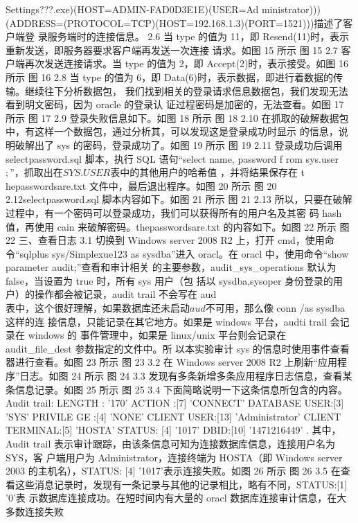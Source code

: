 Settings\Administrator\????\tools\oracle\sqlplus.exe)(HOST=ADMIN-FAD0D3E1E)(USER=Ad
ministrator)))(ADDRESS=(PROTOCOL=TCP)(HOST=192.168.1.3)(PORT=1521)))描述了客户端登
录服务端时的连接信息。
2.6 当 type 的值为 11，即 Resend(11)时，表示重新发送，即服务器要求客户端再发送一次连接
请求。如图 15 所示
图 15
2.7 客户端再次发送连接请求。当 type 的值为 2，即 Accept(2)时，表示接受。如图 16 所示
图 16
2.8 当 type 的值为 6，即 Data(6)时，表示数据，即进行着数据的传输。继续往下分析数据包，
我们找到相关的登录请求信息数据包，我们发现无法看到明文密码，因为 oracle 的登录认
证过程密码是加密的，无法查看。如图 17 所示
图 17
2.9 登录失败信息如下。如图 18 所示
图 18
2.10 在抓取的破解数据包中，有这样一个数据包，通过分析其，可以发现这是登录成功时显示
的信息，说明破解出了 sys 的密码，登录成功了。如图 19 所示
图 19
2.11 登录成功后调用 selectpassword.sql 脚本，执行 SQL 语句“select name, password f
rom sys.user$;”，抓取出在 SYS.USER$表中的其他用户的哈希值 ，并将结果保存在 t
hepasswordsare.txt 文件中，最后退出程序。如图 20 所示
图 20
2.12selectpassword.sql 脚本内容如下。如图 21 所示
图 21
2.13 所以，只要在破解过程中，有一个密码可以登录成功，我们可以获得所有的用户名及其密
码 hash 值，再使用 cain 来破解密码。thepasswordsare.txt 的内容如下。如图 22 所示
图 22
三、查看日志
3.1 切换到 Windows server 2008 R2 上，打开 cmd，使用命令“sqlplus sys/Simplexue123 as
sysdba”进入 oracl。在 oracl 中，使用命令“show parameter audit;”查看和审计相关
的主要参数，audit_sys_operations 默认为 false，当设置为 true 时，所有 sys 用户（包
括以 sysdba,sysoper 身份登录的用户）的操作都会被记录，audit trail 不会写在 aud$表
中，这个很好理解，如果数据库还未启动 aud$不可用，那么像 conn /as sysdba 这样的连
接信息，只能记录在其它地方。如果是 windows 平台，audti trail 会记录在 windows 的
事件管理中，如果是 linux/unix 平台则会记录在 audit_file_dest 参数指定的文件中。所
以本实验审计 sys 的信息时使用事件查看器进行查看。如图 23 所示
图 23
3.2 在 Windows server 2008 R2 上刷新“应用程序”日志。如图 24 所示
图 24
3.3 发现有多条新增多条应用程序日志信息，查看某条信息记录。如图 25 所示
图 25
3.4 下面简略说明一下这条信息所包含的内容。
Audit trail: LENGTH : '170' ACTION :[7] 'CONNECT' DATABASE USER:[3] 'SYS' PRIVILE
GE :[4] 'NONE' CLIENT USER:[13] 'Administrator' CLIENT TERMINAL:[5] 'HOSTA' STATUS:
[4] '1017' DBID:[10] '1471216449' .
其中，Audit trail 表示审计跟踪，由该条信息可知为连接数据库信息，连接用户名为 SYS，客
户端用户为 Administrator，连接终端为 HOSTA（即 Windows server 2003 的主机名），STATUS:
[4] '1017'表示连接失败。如图 26 所示
图 26
3.5 在查看这些消息记录时，发现有一条记录与其他的记录相比，略有不同，STATUS:[1] '0'表
示数据库连接成功。在短时间内有大量的 oracl 数据库连接审计信息，在大多数连接失败
